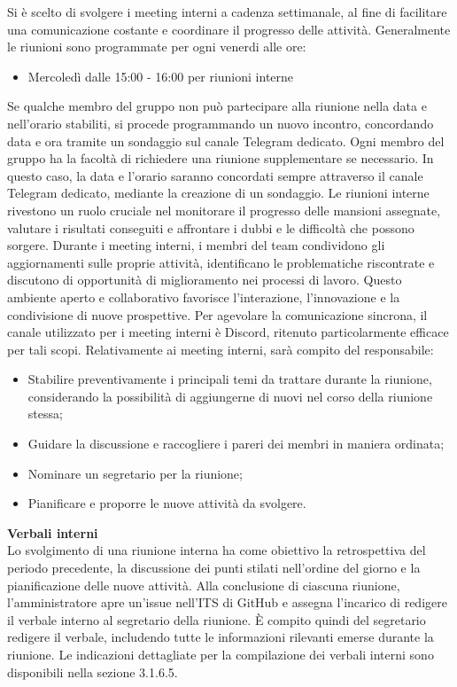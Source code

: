 Si è scelto di svolgere i meeting interni a cadenza settimanale, al fine di facilitare una comunicazione costante e coordinare il progresso delle attività.
Generalmente le riunioni sono programmate per ogni venerdi alle ore:
\begin{itemize}
    \item Mercoledì dalle 15:00 - 16:00 per riunioni interne
\end{itemize}
Se qualche membro del gruppo non può partecipare alla riunione nella data e nell’orario stabiliti, si procede programmando un nuovo incontro, concordando data e ora tramite un sondaggio sul canale Telegram dedicato.
Ogni membro del gruppo ha la facoltà di richiedere una riunione supplementare se necessario. In questo caso, la data e l’orario saranno concordati sempre attraverso il canale Telegram dedicato, mediante la creazione di un sondaggio.
Le riunioni interne rivestono un ruolo cruciale nel monitorare il progresso delle mansioni assegnate, valutare i risultati conseguiti e affrontare i dubbi e le difficoltà che possono sorgere. Durante i meeting interni, i membri del team condividono gli aggiornamenti sulle proprie attività, identificano le problematiche riscontrate e discutono di opportunità di miglioramento nei processi di lavoro. Questo ambiente aperto e collaborativo favorisce l’interazione, l’innovazione e la condivisione di nuove prospettive. Per agevolare la comunicazione sincrona, il canale utilizzato per i meeting interni è Discord, ritenuto particolarmente efficace per tali scopi.
Relativamente ai meeting interni, sarà compito del responsabile:
\begin{itemize}
    \item Stabilire preventivamente i principali temi da trattare durante la riunione, considerando la possibilità di aggiungerne di nuovi nel corso della riunione stessa;
    \item Guidare la discussione e raccogliere i pareri dei membri in maniera ordinata;
    \item Nominare un segretario per la riunione;
    \item Pianificare e proporre le nuove attività da svolgere.
\end{itemize}
\textbf{Verbali interni}\\
Lo svolgimento di una riunione interna ha come obiettivo la retrospettiva del periodo precedente, la discussione dei punti stilati nell’ordine del giorno e la pianificazione delle nuove attività.
Alla conclusione di ciascuna riunione, l’amministratore apre un’issue nell’ITS di GitHub e assegna l’incarico di redigere il verbale interno al segretario della riunione. È compito quindi del segretario redigere il verbale, includendo tutte le informazioni rilevanti emerse durante la riunione. Le indicazioni dettagliate per la compilazione dei verbali interni sono disponibili nella sezione 3.1.6.5.

